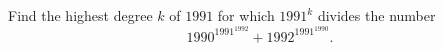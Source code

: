 Find the highest degree $k$ of $1991$ for which $1991^k$ divides the number
\[ 1990^{1991^{1992}} + 1992^{1991^{1990}}. \]
